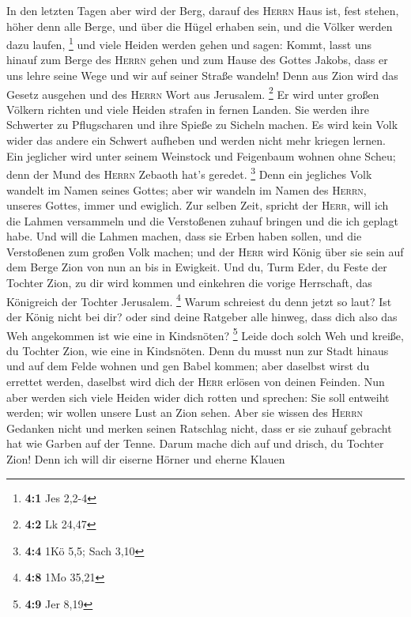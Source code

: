  In den letzten Tagen aber wird der Berg, darauf des
\textsc{Herrn} Haus ist, fest stehen, höher denn alle Berge, und über
die Hügel erhaben sein, und die Völker werden dazu laufen, \footnote{\textbf{4:1}
  Jes 2,2-4}  und viele Heiden werden gehen und sagen:
Kommt, lasst uns hinauf zum Berge des \textsc{Herrn} gehen und zum Hause
des Gottes Jakobs, dass er uns lehre seine Wege und wir auf seiner
Straße wandeln! Denn aus Zion wird das Gesetz ausgehen und des
\textsc{Herrn} Wort aus Jerusalem. \footnote{\textbf{4:2} Lk 24,47}
 Er wird unter großen Völkern richten und viele Heiden
strafen in fernen Landen. Sie werden ihre Schwerter zu Pflugscharen und
ihre Spieße zu Sicheln machen. Es wird kein Volk wider das andere ein
Schwert aufheben und werden nicht mehr kriegen lernen. 
Ein jeglicher wird unter seinem Weinstock und Feigenbaum wohnen ohne
Scheu; denn der Mund des \textsc{Herrn} Zebaoth hat's geredet.
\footnote{\textbf{4:4} 1Kö 5,5; Sach 3,10}  Denn ein
jegliches Volk wandelt im Namen seines Gottes; aber wir wandeln im Namen
des \textsc{Herrn}, unseres Gottes, immer und ewiglich. 
Zur selben Zeit, spricht der \textsc{Herr}, will ich die Lahmen
versammeln und die Verstoßenen zuhauf bringen und die ich geplagt habe.
 Und will die Lahmen machen, dass sie Erben haben sollen,
und die Verstoßenen zum großen Volk machen; und der \textsc{Herr} wird
König über sie sein auf dem Berge Zion von nun an bis in Ewigkeit.
 Und du, Turm Eder, du Feste der Tochter Zion, zu dir wird
kommen und einkehren die vorige Herrschaft, das Königreich der Tochter
Jerusalem. \footnote{\textbf{4:8} 1Mo 35,21}  Warum
schreiest du denn jetzt so laut? Ist der König nicht bei dir? oder sind
deine Ratgeber alle hinweg, dass dich also das Weh angekommen ist wie
eine in Kindsnöten? \footnote{\textbf{4:9} Jer 8,19} 
Leide doch solch Weh und kreiße, du Tochter Zion, wie eine in
Kindsnöten. Denn du musst nun zur Stadt hinaus und auf dem Felde wohnen
und gen Babel kommen; aber daselbst wirst du errettet werden, daselbst
wird dich der \textsc{Herr} erlösen von deinen Feinden. 
Nun aber werden sich viele Heiden wider dich rotten und sprechen: Sie
soll entweiht werden; wir wollen unsere Lust an Zion sehen.
 Aber sie wissen des \textsc{Herrn} Gedanken nicht und
merken seinen Ratschlag nicht, dass er sie zuhauf gebracht hat wie
Garben auf der Tenne.  Darum mache dich auf und drisch,
du Tochter Zion! Denn ich will dir eiserne Hörner und eherne Klauen
